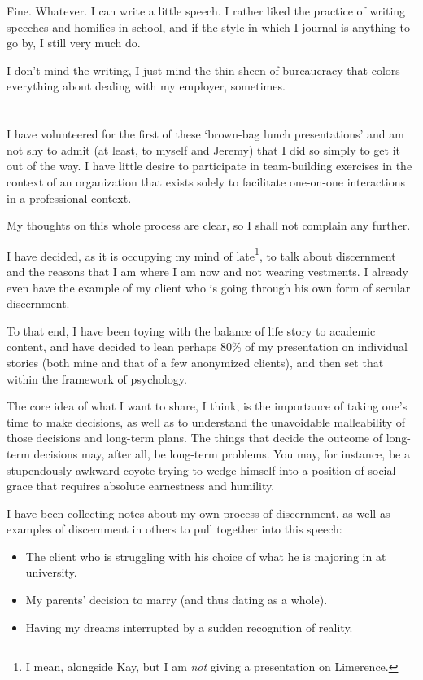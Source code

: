 Fine. Whatever. I can write a little speech. I rather liked the practice of writing speeches and homilies in school, and if the style in which I journal is anything to go by, I still very much do.

I don't mind the writing, I just mind the thin sheen of bureaucracy that colors everything about dealing with my employer, sometimes.

\section{}

I have volunteered for the first of these `brown-bag lunch presentations' and am not shy to admit (at least, to myself and Jeremy) that I did so simply to get it out of the way. I have little desire to participate in team-building exercises in the context of an organization that exists solely to facilitate one-on-one interactions in a professional context.

My thoughts on this whole process are clear, so I shall not complain any further.

I have decided, as it is occupying my mind of late\footnote{I mean, alongside Kay, but I am \emph{not} giving a presentation on Limerence.}, to talk about discernment and the reasons that I am where I am now and not wearing vestments. I already even have the example of my client who is going through his own form of secular discernment.

To that end, I have been toying with the balance of life story to academic content, and have decided to lean perhaps 80\% of my presentation on individual stories (both mine and that of a few anonymized clients), and then set that within the framework of psychology.

The core idea of what I want to share, I think, is the importance of taking one's time to make decisions, as well as to understand the unavoidable malleability of those decisions and long-term plans. The things that decide the outcome of long-term decisions may, after all, be long-term problems. You may, for instance, be a stupendously awkward coyote trying to wedge himself into a position of social grace that requires absolute earnestness and humility.

I have been collecting notes about my own process of discernment, as well as examples of discernment in others to pull together into this speech:

\begin{itemize}
\tightlist
\item
  The client who is struggling with his choice of what he is majoring in at university.
\item
  My parents' decision to marry (and thus dating as a whole).
\item
  Having my dreams interrupted by a sudden recognition of reality.
\end{itemize}

